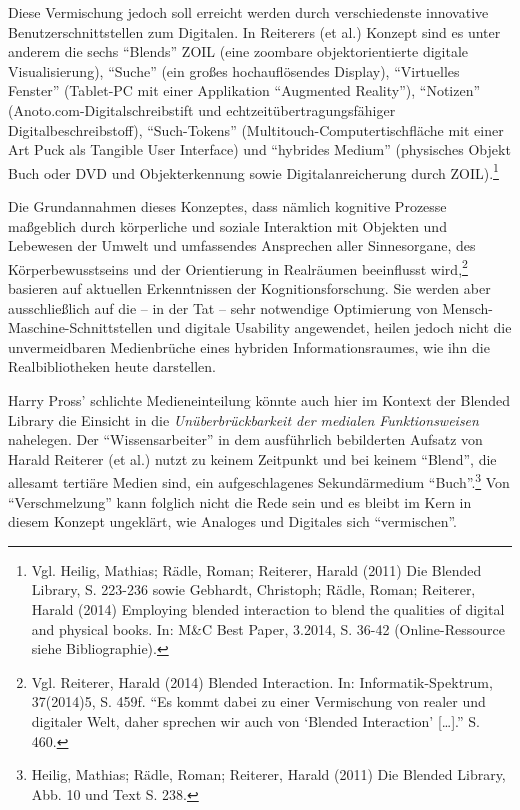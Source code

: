 \documentclass[a4paper,
fontsize=11pt,
oneside,
numbers=noperiodatend,
parskip=half-,
bibliography=totoc,
final
]{scrartcl}
\begin{document}
Diese Vermischung jedoch soll erreicht werden durch verschiedenste
innovative Benutzerschnittstellen zum Digitalen. In Reiterers (et al.)
Konzept sind es unter anderem die sechs \enquote{Blends} ZOIL (eine
zoombare objektorientierte digitale Visualisierung), \enquote{Suche}
(ein großes hochauflösendes Display), \enquote{Virtuelles Fenster}
(Tablet-PC mit einer Applikation \enquote{Augmented Reality}),
\enquote{Notizen} (Anoto.com-Digitalschreibstift und
echtzeitübertragungsfähiger Digitalbeschreibstoff),
\enquote{Such-Tokens} (Multitouch-Computertischfläche mit einer Art Puck
als Tangible User Interface) und \enquote{hybrides Medium} (physisches
Objekt Buch oder DVD und Objekterkennung sowie Digitalanreicherung durch
ZOIL).\footnote{Vgl. Heilig, Mathias; Rädle, Roman; Reiterer, Harald
  (2011) Die Blended Library, S. 223-236 sowie Gebhardt, Christoph;
  Rädle, Roman; Reiterer, Harald (2014) Employing blended interaction to
  blend the qualities of digital and physical books. In: M\&C Best
  Paper, 3.2014, S. 36-42 (Online-Ressource siehe Bibliographie).}

Die Grundannahmen dieses Konzeptes, dass nämlich kognitive Prozesse
maßgeblich durch körperliche und soziale Interaktion mit Objekten und
Lebewesen der Umwelt und umfassendes Ansprechen aller Sinnesorgane, des
Körperbewusstseins und der Orientierung in Realräumen beeinflusst
wird,\footnote{Vgl. Reiterer, Harald (2014) Blended Interaction. In:
  Informatik-Spektrum, 37(2014)5, S. 459f. \enquote{Es kommt dabei zu
  einer Vermischung von realer und digitaler Welt, daher sprechen wir
  auch von \enquote{Blended Interaction} {[}\ldots{}{]}.} S. 460.}
basieren auf aktuellen Erkenntnissen der Kognitionsforschung. Sie werden
aber ausschließlich auf die -- in der Tat -- sehr notwendige Optimierung
von Mensch-Maschine-Schnittstellen und digitale Usability angewendet,
heilen jedoch nicht die unvermeidbaren Medienbrüche eines hybriden
Informationsraumes, wie ihn die Realbibliotheken heute darstellen.

Harry Pross' schlichte Medieneinteilung könnte auch hier im Kontext der
Blended Library die Einsicht in die \emph{Unüberbrückbarkeit der
medialen Funktionsweisen} nahelegen. Der \enquote{Wissensarbeiter} in
dem ausführlich bebilderten Aufsatz von Harald Reiterer (et al.) nutzt
zu keinem Zeitpunkt und bei keinem \enquote{Blend}, die allesamt
tertiäre Medien sind, ein aufgeschlagenes Sekundärmedium
\enquote{Buch}.\footnote{Heilig, Mathias; Rädle, Roman; Reiterer, Harald
  (2011) Die Blended Library, Abb. 10 und Text S. 238.} Von
\enquote{Verschmelzung} kann folglich nicht die Rede sein und es bleibt
im Kern in diesem Konzept ungeklärt, wie Analoges und Digitales sich
\enquote{vermischen}.
\end{document}
